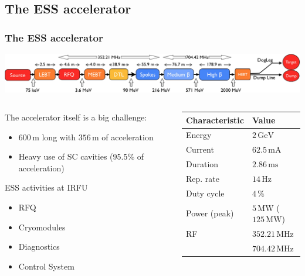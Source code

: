\subsection{The ESS accelerator}
\begin{frame}
  \frametitle{The ESS accelerator}
  \includegraphics[width=\textwidth]{01_Neutron/fig/fig000_ESS_acc}
  \vfill
  \begin{columns}
    \begin{column}{0.45\textwidth}
      The accelerator itself is a big challenge:
      \begin{itemize}
        \item $600\,\mathrm{m}$ long with $356\,\mathrm{m}$ of acceleration
        \item Heavy use of SC cavities (95.5\% of acceleration)
      \end{itemize}
      \begin{block}{ESS activities at IRFU}
        \begin{itemize}
          \item RFQ
          \item Cryomodules
          \item Diagnostics
          \item Control System
        \end{itemize}
      \end{block}
    \end{column}
    \begin{column}{0.50\textwidth}
      \begin{tabularx}{\linewidth}{XX}
        \toprule
        Characteristic & Value                                 \\
        \midrule
        Energy         & $2\,\mathrm{GeV}$                     \\
        Current        & $62.5\,\mathrm{mA}$                   \\
        Duration       & $2.86\,\mathrm{ms}$                   \\
        Rep. rate      & $14\,\mathrm{Hz}$                     \\
        Duty cycle     & $4\,\mathrm{\%}$                      \\
        Power (peak)   & $5\,\mathrm{MW}$ ($125\,\mathrm{MW}$) \\
        RF             & $352.21\,\mathrm{MHz}$                \\
                       & $704.42\,\mathrm{MHz}$                \\
        \bottomrule
      \end{tabularx}
    \end{column}
  \end{columns}
\end{frame}